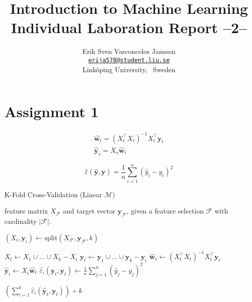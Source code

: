 \documentclass[a4paper, twocolumn]{article}
\title{Introduction to Machine Learning \\
       Individual Laboration Report --2--}
\author{{Erik Sven Vasconcelos Jansson} \\
        {\href{mailto:erija578@student.liu.se}
        {\texttt{erija578@student.liu.se}}} \\
        {Linköping University, \, Sweden}}
\begin{document}
    \maketitle %

    \section*{Assignment 1}

    \begin{gather} \label{eq:linrhat}
        \mathbf{\hat{w}}^{}_t = (X_t^\intercal X^{}_t)^{-1} X_t^\intercal \mathbf{y}^{}_t \\
        \mathbf{\hat{y}}^{}_v = X^{}_v \mathbf{\hat{w}}^{}_t
    \end{gather}

    \begin{equation} \label{eq:mse}
        \hat{\varepsilon}(\mathbf{\hat{y}}, \mathbf{y}) = \frac{1}{n}\sum_{i=1}^{n}(\hat{y}_i - y_i)^2
    \end{equation}

    \begin{algorithm}
        \caption{K-Fold Cross-Validation (Linear $\mathcal{M}$)}
    \label{alg:kfoldcv}
    \begin{algorithmic}[1]
        \REQUIRE feature matrix $X_\mathcal{F}$ and target vector $\mathbf{y_\mathcal{F}}$,
                 given a feature selection $\mathcal{F}$ with cardinality $|\mathcal{F}|$.

        \STATE $(X_i, \mathbf{y}_i) \leftarrow \mathrm{split}(X_\mathcal{F}, \mathbf{y}_\mathcal{F}, k)$ 

            \STATE $X_t \leftarrow X_1 \cup \dots \cup X_k - X_i$ 
            \STATE $\mathbf{y}_t \leftarrow \mathbf{y}_1 \cup \dots \cup \mathbf{y}_k - \mathbf{y}_i$ 
            \STATE $\mathbf{\hat{w}}_t \leftarrow (X_t^\intercal X^{}_t)^{-1} X_t^\intercal \mathbf{y}^{}_t$ 
            \STATE $\mathbf{\hat{y}}^{}_i \leftarrow X^{}_i \mathbf{\hat{w}}^{}_t$ 
            \STATE $\hat{\varepsilon}_i(\mathbf{\hat{y}}_t, \mathbf{y}_t) \leftarrow \frac{1}{n}\sum_{j=1}^{n}(\hat{y}_j - y_j)^2$
        \ENDFOR

        \RETURN $(\sum_{i=1}^k{\hat{\varepsilon}_i(\mathbf{\hat{y}}_t, \mathbf{y}_t)}) \div k$
    \end{algorithmic}
    \end{algorithm}
\end{document}
